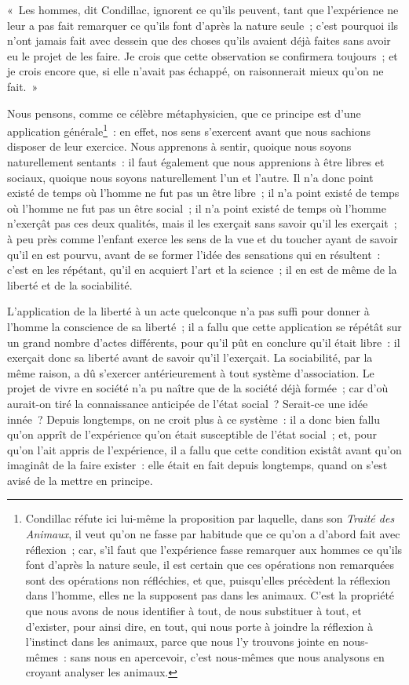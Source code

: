 \documentclass[french,twoside]{book} %
\newcommand\chaptercont{} %
\begin{document}
\chaptercont
\noindent « Les hommes, dit Condillac, ignorent ce qu’ils peuvent, tant que l’expérience ne leur a pas fait remarquer ce qu’ils font d’après la nature seule ; c’est pourquoi ils n’ont jamais fait avec dessein que des choses qu’ils avaient déjà faites sans avoir eu le projet de les faire. Je crois que cette observation se confirmera toujours ; et je crois encore que, si elle n’avait pas échappé, on raisonnerait mieux qu’on ne fait. »\par
Nous pensons, comme ce célèbre métaphysicien, que ce principe est d’une application générale\footnote{Condillac réfute ici lui-même la proposition par laquelle, dans son {\itshape Traité des Animaux}, il veut qu’on ne fasse par habitude que ce qu’on a d’abord fait avec réflexion ; car, s’il faut que l’expérience fasse remarquer aux hommes ce qu’ils font d’après la nature seule, il est certain que ces opérations non remarquées sont des opérations non réfléchies, et que, puisqu’elles précèdent la réflexion dans l’homme, elles ne la supposent pas dans les animaux. C’est la propriété que nous avons de nous identifier à tout, de nous substituer à tout, et d’exister, pour ainsi dire, en tout, qui nous porte à joindre la réflexion à l’instinct dans les animaux, parce que nous l’y trouvons jointe en nous-mêmes : sans nous en apercevoir, c’est nous-mêmes que nous analysons en croyant analyser les animaux.} : en effet, nos sens s’exercent avant que nous sachions disposer de leur exercice. Nous apprenons à sentir, quoique nous soyons naturellement sentants : il faut également que nous apprenions à être libres et sociaux, quoique nous soyons naturellement l’un et l’autre. Il n’a donc point existé de temps où l’homme ne fut pas un être libre ; il n’a point existé de temps où l’homme ne fut pas un être social ; il n’a point existé de temps où l’homme n’exerçât pas ces deux qualités, mais il les exerçait sans savoir qu’il les exerçait ; à peu près comme l’enfant exerce les sens de la vue et du toucher ayant de savoir qu’il en est pourvu, avant de se former l’idée des sensations qui en résultent : c’est en les répétant, qu’il en acquiert l’art et la science ; il en est de même de la liberté et de la sociabilité.\par
L’application de la liberté à un acte quelconque n’a pas suffi pour donner à l’homme la conscience de sa liberté ; il a fallu que cette application se répétât sur un grand nombre d’actes différents, pour qu’il pût en conclure qu’il était libre : il exerçait donc sa liberté avant de savoir qu’il l’exerçait. La sociabilité, par la même raison, a dû s’exercer antérieurement à tout système d’association. Le projet de vivre en société n’a pu naître que de la société déjà formée ; car d’où aurait-on tiré la connaissance anticipée de l’état social ? Serait-ce une idée innée ? Depuis longtemps, on ne croit plus à ce système : il a donc bien fallu qu’on apprît de l’expérience qu’on était susceptible de l’état social ; et, pour qu’on l’ait appris de l’expérience, il a fallu que cette condition existât avant qu’on imaginât de la faire exister : elle était en fait depuis longtemps, quand on s’est avisé de la mettre en principe.\par
\end{document}
